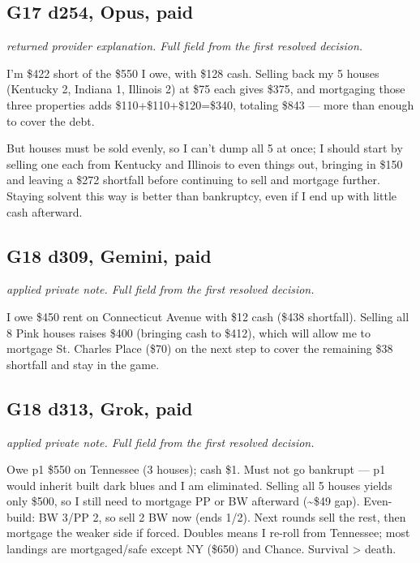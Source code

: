 \subsection*{G17 d254, Opus, paid}
{\small\textit{returned provider explanation. Full field from the first resolved decision.}\par I'm \$422 short of the \$550 I owe, with \$128 cash. Selling back my 5 houses (Kentucky 2, Indiana 1, Illinois 2) at \$75 each gives \$375, and mortgaging those three properties adds \$110+\$110+\$120=\$340, totaling \$843 — more than enough to cover the debt.\par But houses must be sold evenly, so I can't dump all 5 at once; I should start by selling one each from Kentucky and Illinois to even things out, bringing in \$150 and leaving a \$272 shortfall before continuing to sell and mortgage further. Staying solvent this way is better than bankruptcy, even if I end up with little cash afterward.\par \par}
\subsection*{G18 d309, Gemini, paid}
{\small\textit{applied private note. Full field from the first resolved decision.}\par I owe \$450 rent on Connecticut Avenue with \$12 cash (\$438 shortfall). Selling all 8 Pink houses raises \$400 (bringing cash to \$412), which will allow me to mortgage St. Charles Place (\$70) on the next step to cover the remaining \$38 shortfall and stay in the game.\par}
\subsection*{G18 d313, Grok, paid}
{\small\textit{applied private note. Full field from the first resolved decision.}\par Owe p1 \$550 on Tennessee (3 houses); cash \$1. Must not go bankrupt — p1 would inherit built dark blues and I am eliminated. Selling all 5 houses yields only \$500, so I still need to mortgage PP or BW afterward (\textasciitilde{}\$49 gap). Even-build: BW 3/PP 2, so sell 2 BW now (ends 1/2). Next rounds sell the rest, then mortgage the weaker side if forced. Doubles means I re-roll from Tennessee; most landings are mortgaged/safe except NY (\$650) and Chance. Survival > death.\par}
